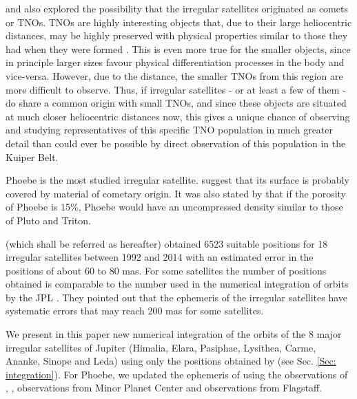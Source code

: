 \documentclass[useAMS,usenatbib]{mn2e}
\begin{document}
\cite{Sheppard2005} and \cite{Jewitt2007} also explored the possibility that the irregular satellites originated as comets or TNOs. TNOs are highly interesting objects that, due to their large heliocentric distances, may be highly preserved with physical properties similar to those they had when they were formed \citep{Barucci2008}. This is even more true for the smaller objects, since in principle larger sizes favour physical differentiation processes in the body and vice-versa. However, due to the distance, the smaller TNOs from this region are more difficult to observe. Thus, if irregular satellites - or at least a few of them - do share a common origin with small TNOs, and since these objects are situated at much closer heliocentric distances now, this gives a unique chance of observing and studying representatives of this specific TNO population in much greater detail than could ever be possible by direct observation of this population in the Kuiper Belt. 

Phoebe is the most studied irregular satellite. \cite{Clark2005} suggest that its surface is probably covered by material of cometary origin. It was also stated by \cite{Johnson2005} that if the porosity of Phoebe is 15\%, Phoebe would have an uncompressed density similar to those of Pluto and Triton.

\cite{GomesJunior2015} (which shall be referred as  hereafter) obtained 6523 suitable positions for 18 irregular satellites between 1992 and 2014 with an estimated error in the positions of about 60 to 80 mas. For some satellites the number of positions obtained is comparable to the number used in the numerical integration of orbits by the JPL \citep{Jacobson2012}. They pointed out that the ephemeris of the irregular satellites have systematic errors that may reach 200 mas for some satellites.

We present in this paper new numerical integration of the orbits of the 8 major irregular satellites of Jupiter (Himalia, Elara, Pasiphae, Lysithea, Carme, Ananke, Sinope and Leda) using only the positions obtained by %
 (see Sec. \ref{Sec: integration}). %
For Phoebe, we updated the ephemeris of \cite{Desmars2013} using the observations of , \cite{Peng2015}, observations from Minor Planet Center and observations from Flagstaff. 
\end{document}
